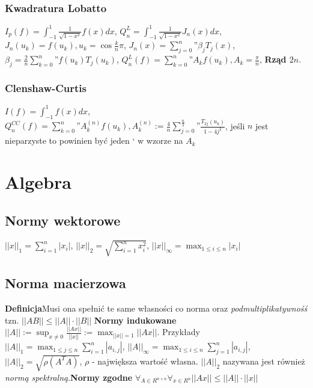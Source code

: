 \documentclass{article}
\begin{document}
\begin{minipage}[t]{.33\textwidth}
\subsubsection*{Kwadratura Lobatto}
$I_p(f) = \int_{-1}^{1}\frac{1}{\sqrt{1-x^2}}f(x)dx$, $Q_n^L = \int_{-1}^{1}\frac{1}{\sqrt{1-x^2}}J_n(x)dx$, $J_n(u_k) = f(u_k), u_k = \cos{\frac{k}{n}\pi}$, $J_n(x) = \sum_{j=0}^n\text{''}\beta_jT_j(x)$, $\beta_j = \frac{2}{n}\sum_{k=0}^n\text{''}f(u_k)T_j(u_k)$, $Q_n^L(f) = \sum_{k=0}^n\text{''}A_kf(u_k), A_k = \frac{\pi}{n}$, \textbf{Rząd $2n$}.
\subsubsection*{Clenshaw-Curtis}
$I(f) = \int_{-1}^1 f(x) dx$, $Q_n^{CC}(f) = \sum_{k=0}^n\text{''}A_k^{(n)}f(u_k),A_k^{(n)}:=\frac{4}{n}\sum_{j=0}^{\frac{n}{2}}\text{''}\frac{T_{2j}(u_k)}{1-4j^2}$, jeśli $n$ jest nieparzyste to powinien być jeden ` w wzorze na $A_k$
\section*{Algebra}
\subsection*{Normy wektorowe}
$||x||_1 = \sum_{i=1}^n |x_i|$, $||x||_2 = \sqrt{\sum_{i=1}^n x_i^2}$, $||x||_\infty = \max_{1\leq i \leq n} |x_i|$
\subsection*{Norma macierzowa}
\textbf{Definicja}Musi ona spełnić te same własności co norma oraz \textit{podmultiplikatywnośś} tzn. $||AB|| \leq ||A||\cdot||B||$
\textbf{Normy indukowane} $||A|| := \sup_{x\neq 0}\frac{||Ax||}{||x||} := \max_{||x|| = 1}||Ax||$. 
Przykłady $||A||_1 = \max_{1\leq j \leq n}\sum_{i=1}^n|a_{i,j}|$, $||A||_\infty = \max_{1\leq i \leq n}\sum_{j=1}^n|a_{i,j}|$, $||A||_2 = \sqrt{\rho(A^TA)}$, $\rho$ - największa wartość własna.  $||A||_2$ nazywana jest również \textit{normą spektralną}.\textbf{Normy zgodne} $\forall_{A\in R^{n\times n}}\forall_{x \in R^n} ||Ax|| \leq ||A||\cdot||x||$
\end{minipage}
\end{document}
